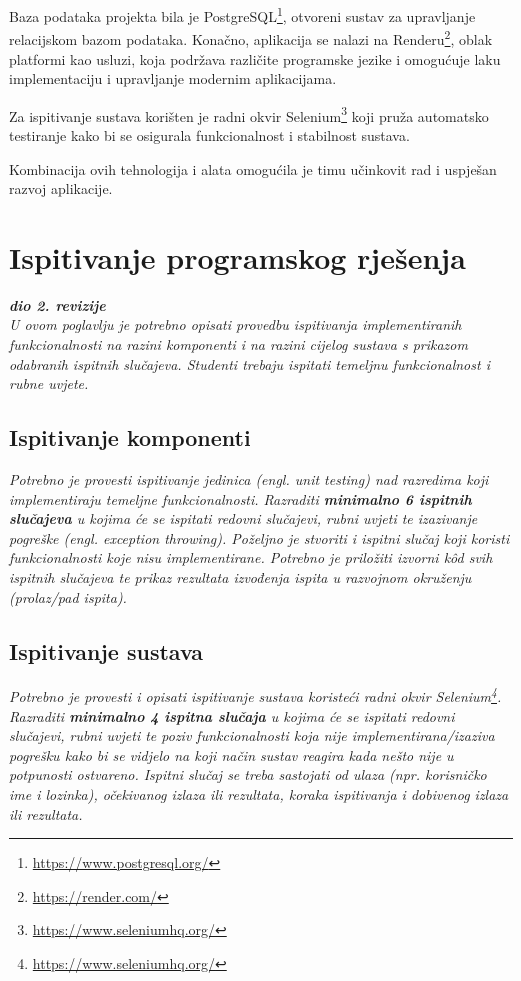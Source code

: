 			 Baza podataka projekta bila je PostgreSQL\footnote{\url{https://www.postgresql.org/}}, otvoreni sustav za upravljanje relacijskom bazom podataka. Konačno, aplikacija se nalazi na Renderu\footnote{\url{https://render.com/}}, oblak platformi kao usluzi, koja podržava različite programske jezike i omogućuje laku implementaciju i upravljanje modernim aplikacijama.
			 
			 Za ispitivanje sustava korišten je radni okvir Selenium\footnote{\url{https://www.seleniumhq.org/}} koji pruža automatsko testiranje kako bi se osigurala funkcionalnost i stabilnost sustava.
			 
			 Kombinacija ovih tehnologija i alata omogućila je timu učinkovit rad i uspješan razvoj aplikacije.
			
			
			\eject 
		
	
		\section{Ispitivanje programskog rješenja}
			
			\textbf{\textit{dio 2. revizije}}\\
			
			 \textit{U ovom poglavlju je potrebno opisati provedbu ispitivanja implementiranih funkcionalnosti na razini komponenti i na razini cijelog sustava s prikazom odabranih ispitnih slučajeva. Studenti trebaju ispitati temeljnu funkcionalnost i rubne uvjete.}
	
			
			\subsection{Ispitivanje komponenti}
			\textit{Potrebno je provesti ispitivanje jedinica (engl. unit testing) nad razredima koji implementiraju temeljne funkcionalnosti. Razraditi \textbf{minimalno 6 ispitnih slučajeva} u kojima će se ispitati redovni slučajevi, rubni uvjeti te izazivanje pogreške (engl. exception throwing). Poželjno je stvoriti i ispitni slučaj koji koristi funkcionalnosti koje nisu implementirane. Potrebno je priložiti izvorni kôd svih ispitnih slučajeva te prikaz rezultata izvođenja ispita u razvojnom okruženju (prolaz/pad ispita). }
			
			
			
			\subsection{Ispitivanje sustava}
			
			 \textit{Potrebno je provesti i opisati ispitivanje sustava koristeći radni okvir Selenium\footnote{\url{https://www.seleniumhq.org/}}. Razraditi \textbf{minimalno 4 ispitna slučaja} u kojima će se ispitati redovni slučajevi, rubni uvjeti te poziv funkcionalnosti koja nije implementirana/izaziva pogrešku kako bi se vidjelo na koji način sustav reagira kada nešto nije u potpunosti ostvareno. Ispitni slučaj se treba sastojati od ulaza (npr. korisničko ime i lozinka), očekivanog izlaza ili rezultata, koraka ispitivanja i dobivenog izlaza ili rezultata.\\ }
			 
